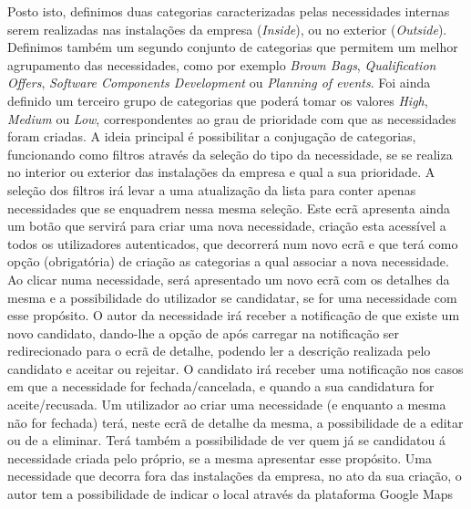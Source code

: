 Posto isto, definimos duas categorias caracterizadas pelas necessidades internas serem realizadas nas instalações da empresa (\textit{Inside}), 
ou no exterior (\textit{Outside}). 
Definimos também um segundo conjunto de categorias que permitem um melhor agrupamento das necessidades, como por exemplo \textit{Brown Bags}, 
\textit{Qualification Offers}, \textit{Software Components Development} ou \textit{Planning of events}. 
Foi ainda definido um terceiro grupo de categorias que poderá tomar os valores \textit{High}, \textit{Medium} ou \textit{Low}, 
correspondentes ao grau de prioridade com que as necessidades foram criadas. 
A ideia principal é possibilitar a conjugação de categorias, funcionando como filtros através da seleção do tipo da necessidade, 
se se realiza no interior ou exterior das instalações da empresa e qual a sua prioridade. 
A seleção dos filtros irá levar a uma atualização da lista para conter apenas necessidades que se enquadrem nessa mesma seleção. 
Este ecrã apresenta ainda um botão que servirá para criar uma nova necessidade, criação esta acessível a todos os utilizadores autenticados, 
que decorrerá num novo ecrã e que terá como opção (obrigatória) de criação as categorias a qual associar a nova necessidade. 
Ao clicar numa necessidade, será apresentado um novo ecrã com os detalhes da mesma e a possibilidade do utilizador se candidatar, 
se for uma necessidade com esse propósito. O autor da necessidade irá receber a notificação de que existe um novo candidato, 
dando-lhe a opção de após carregar na notificação ser redirecionado para o ecrã de detalhe, podendo ler a descrição realizada pelo candidato e aceitar ou rejeitar. 
O candidato irá receber uma notificação nos casos em que a necessidade for fechada/cancelada, e quando a sua candidatura for aceite/recusada. 
Um utilizador ao criar uma necessidade (e enquanto a mesma não for fechada) terá, neste ecrã de detalhe da mesma, a possibilidade de a editar ou de a eliminar. 
Terá também a possibilidade de ver quem já se candidatou á necessidade criada pelo próprio, se a mesma apresentar esse propósito. 
Uma necessidade que decorra fora das instalações da empresa, no ato da sua criação, o autor tem a possibilidade de indicar o local através da plataforma Google Maps

